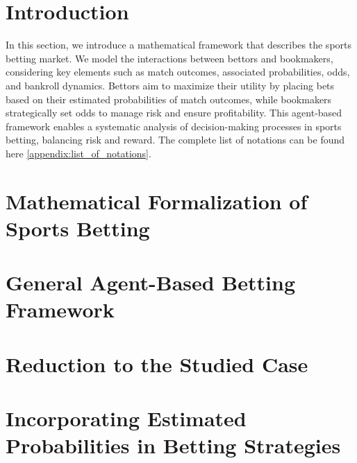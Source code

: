 
\section{Introduction}

In this section, we introduce a mathematical framework that describes the sports betting market. We model the interactions between bettors and bookmakers, considering key elements such as match outcomes, associated probabilities, odds, and bankroll dynamics. Bettors aim to maximize their utility by placing bets based on their estimated probabilities of match outcomes, while bookmakers strategically set odds to manage risk and ensure profitability. This agent-based framework enables a systematic analysis of decision-making processes in sports betting, balancing risk and reward. The complete list of notations can be found here \ref{appendix:list_of_notations}.

\section{Mathematical Formalization of Sports Betting}



\section{General Agent-Based Betting Framework}



\section{Reduction to the Studied Case}




\section{Incorporating Estimated Probabilities in Betting Strategies}




